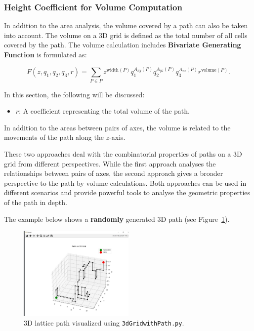 \documentclass{article}
\begin{document}
\subsubsection{Height Coefficient for Volume Computation}

In addition to the area analysis, the volume covered by a path can also be taken into account. The volume on a 3D grid is defined as the total number of all cells covered by the path. The volume calculation includes \textbf{Bivariate Generating Function} is formulated as:

\[
F(z, q_1, q_2, q_3, r) = \sum_{P \in P} z^{\text{width}(P)} q_1^{A_{xy}(P)} q_2^{A_{yz}(P)} q_3^{A_{xz}(P)} r^{\text{volume}(P)}.
\]

In this section, the following will be discussed:
\begin{itemize}
    \item \(r\): A coefficient representing the total volume of the path.
\end{itemize}

In addition to the areas between pairs of axes, the volume is related to the movements of the path along the \(z\)-axis.



These two approaches deal with the combinatorial properties of paths on a 3D grid from different perspectives. While the first approach analyses the relationships between pairs of axes, the second approach gives a broader perspective to the path by volume calculations. Both approaches can be used in different scenarios and provide powerful tools to analyse the geometric properties of the path in depth.


The example below shows a \textbf{randomly} generated 3D path (see Figure~\ref{fig:3d-path}).

\begin{figure}[H]
    \centering
    \includegraphics[width=0.5\textwidth]{images/3dpath.jpg}
    \caption{3D lattice path visualized using \texttt{3dGridwithPath.py}.}
    \label{fig:3d-path}
\end{figure}
\end{document}
